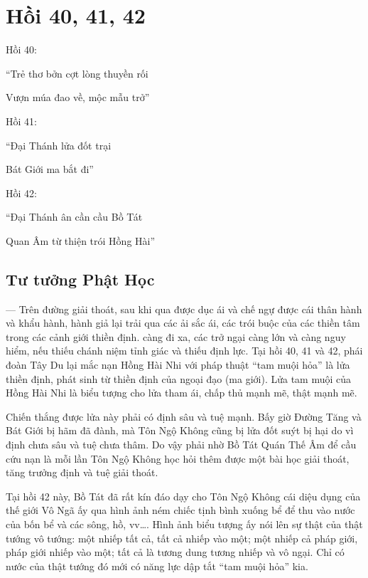 \chapter{Hồi 40, 41, 42} %
\label{cha:hoi_40_41}

Hồi 40:

\begin{itshape}
``Trẻ thơ bởn cợt lòng thuyền rối

Vượn múa đao về, mộc mẫu trở''
\end{itshape}

Hồi 41:

\begin{itshape}
``Đại Thánh lửa đốt trại

Bát Giới ma bắt đi''
\end{itshape}

Hồi 42:

\begin{itshape}
``Đại Thánh ân cần cầu Bồ Tát 

Quan Âm từ thiện trói Hồng Hài''
\end{itshape}

\section{Tư tưởng Phật Học} %
\label{sec:40_41_phat_hoc}

— Trên đường giải thoát, sau khi qua được dục ái và chế ngự được cái thân hành và khẩu hành, hành giả lại trải qua các ải sắc ái, các trói buộc của các thiền tâm trong các cảnh giới thiền định. càng đi xa, các trở ngại càng lớn và càng nguy hiểm, nếu thiếu chánh niệm tỉnh giác và thiếu định lực. Tại hồi 40, 41 và 42, phái đoàn Tây Du lại mắc nạn Hồng Hài Nhi với pháp thuật ``tam muội hỏa'' là lửa thiền định, phát sinh từ thiền định của ngoại đạo (ma giới). Lửa tam muội của Hồng Hài Nhi là biểu tượng cho lửa tham ái, chấp thủ mạnh mẽ, thật mạnh mẽ.

Chiến thắng được lửa này phải có định sâu và tuệ mạnh. Bấy giờ Đường Tăng và Bát Giới bị hãm đã đành, mà Tôn Ngộ Không cũng bị lửa đốt suýt bị hại do vì định chưa sâu và tuệ chưa thâm. Do vậy phải nhờ Bồ Tát Quán Thế Âm để cầu cứu nạn là mỗi lần Tôn Ngộ Không học hỏi thêm được một bài học giải thoát, tăng trưởng định và tuệ giải thoát.

Tại hồi 42 này, Bồ Tát đã rất kín đáo dạy cho Tôn Ngộ Không cái diệu dụng của thế giới Vô Ngã ấy qua hình ảnh ném chiếc tịnh bình xuống bể để thu vào nước của bốn bể và các sông, hồ, vv\ldots. Hình ảnh biểu tượng ấy nói lên sự thật của thật tướng vô tướng: một nhiếp tất cả, tất cả nhiếp vào một; một nhiếp cả pháp giới, pháp giới nhiếp vào một; tất cả là tương dung tương nhiếp và vô ngại. Chỉ có nước của thật tướng đó mới có năng lực dập tắt ``tam muội hỏa'' kia.

